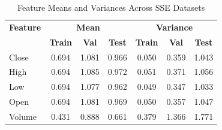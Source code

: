 \begin{table}[htp]
    \centering
    \small
    \begin{tabular}{l|ccc|ccc}
        \toprule
        \textbf{Feature} & \multicolumn{3}{c|}{\textbf{Mean}} & \multicolumn{3}{c}{\textbf{Variance}} \\
        & \textbf{Train} & \textbf{Val} & \textbf{Test} & \textbf{Train} & \textbf{Val} & \textbf{Test} \\
        \midrule
        Close           & 0.694 & 1.081 & 0.966 & 0.050 & 0.359 & 1.043 \\
        High            & 0.694 & 1.085 & 0.972 & 0.051 & 0.371 & 1.056 \\
        Low             & 0.694 & 1.077 & 0.962 & 0.049 & 0.347 & 1.033 \\
        Open            & 0.694 & 1.081 & 0.969 & 0.050 & 0.357 & 1.047 \\
        Volume          & 0.431 & 0.888 & 0.661 & 0.379 & 1.366 & 1.771 \\
        \bottomrule
    \end{tabular}
    \caption{Feature Means and Variances Across SSE Datasets}
    \label{tab:sse_feature_stats}
\end{table}